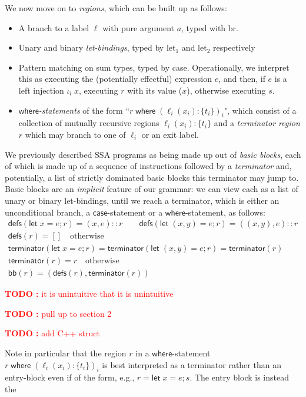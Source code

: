 \documentclass[acmsmall,screen,review]{acmart}
\newcounter{todos}
\newcommand{\TODO}[1]{{
  \stepcounter{todos}
  \begin{center}\large{\textcolor{red}{\textbf{TODO \arabic{todos}:} #1}}\end{center}
}}
\newcommand{\ms}[1]{\ensuremath{\mathsf{#1}}}
\newcommand{\lto}{:}
\newcommand{\letstmt}[3]{\ensuremath{\ms{let}\;#1 = #2; #3}}
\newcommand{\where}[2]{#1\;\ms{where}\;#2}
\newcommand{\wbranch}[3]{#1(#2) \lto \{#3\}}
\newcommand{\brle}[1]{{\textsf{#1}}}
\begin{document}
We now move on to \emph{regions}, which can be built up as follows:
\begin{itemize}
  \item A branch to a label $\ell$ with pure argument $a$, typed with \brle{br}.
  
  \item Unary and binary \emph{let-bindings}, typed by \brle{let$_1$} and \brle{let$_2$}
  respectively
  
  \item Pattern matching on sum types, typed by \brle{case}. Operationally, we interpret this as
  executing the (potentially effectful) expression $e$, and then, if $e$ is a left injection
  $\iota_l\;x$, executing $r$ with its value ($x$), otherwise executing $s$.
  
  \item \emph{\ms{where}-statements} of the form ``$\where{r}{(\wbranch{\ell_i}{x_i}{t_i})_i}$",
  which consist of a collection of mutually recursive regions $\wbranch{\ell_i}{x_i}{t_i}$ and a
  \emph{terminator region} $r$ which may branch to one of $\ell_i$ or an exit label.
\end{itemize}
We previously described SSA programs as being made up out of \emph{basic blocks}, each of which is
made up of a sequence of instructions followed by a \emph{terminator} and, potentially, a list of
strictly dominated basic blocks this terminator may jump to. Basic blocks are an \emph{implicit}
feature of our grammar: we can view each as a list of unary or binary let-bindings, until we reach a
terminator, which is either an unconditional branch, a \ms{case}-statement or a
\ms{where}-statement, as follows:
\begin{gather*}
  \ms{defs}(\letstmt{x}{e}{r}) = (x, e)::r \qquad 
  \ms{defs}(\letstmt{(x, y)}{e}{r}) = ((x, y), e)::r \\
  \ms{defs}(r) = [] \quad \text{otherwise} \\
  \ms{terminator}(\letstmt{x}{e}{r}) 
  = \ms{terminator}(\letstmt{(x, y)}{e}{r}) 
  = \ms{terminator}(r) \\
  \ms{terminator}(r) = r \quad \text{otherwise} \\
  \ms{bb}(r) = (\ms{defs}(r), \ms{terminator}(r))
\end{gather*}
\TODO{it is unintuitive that it is unintuitive}
\TODO{pull up to section 2}
\TODO{add C++ struct}
Note in particular that the region $r$ in a \ms{where}-statement
$\where{r}{(\wbranch{\ell_i}{x_i}{t_i})_i}$ is best interpreted as a terminator rather than an
entry-block even if of the form, e.g., $r = \letstmt{x}{e}{s}$. The entry block is instead the
\end{document}
